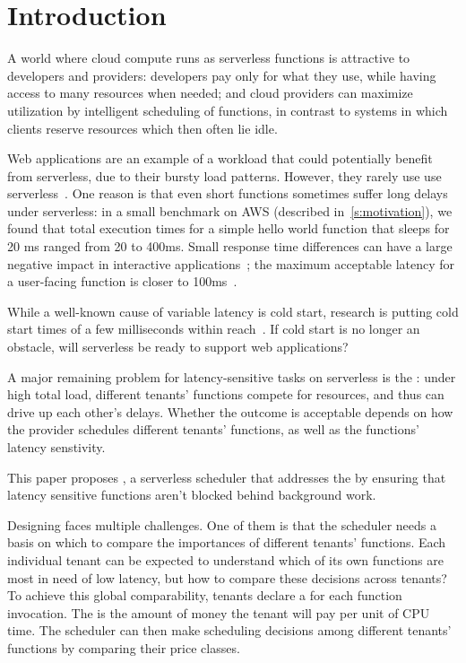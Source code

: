 \section{Introduction}
\label{s:intro}

A world where cloud compute runs as serverless functions is attractive to
developers and providers: developers pay only for what they use, while having
access to many resources when needed; and cloud providers can maximize
utilization by intelligent scheduling of functions, in contrast to systems in
which clients reserve resources which then often lie idle.

Web applications are an example of a workload that could potentially benefit
from serverless, due to their bursty load patterns. However, they rarely use use
serverless~\cite{reddit-serverless1, reddit-serverless2, not-lambda-blog}. One
reason is that even short functions sometimes suffer long delays under
serverless: in a small benchmark on AWS (described in~\autoref{s:motivation}), we found that total execution times for a
simple hello world function that sleeps for 20 ms ranged from 20 to 400ms. Small
response time differences can have a large negative impact in interactive
applications~\cite{amz-page-load,google-page-load}; the maximum acceptable
latency for a user-facing function is closer to 100ms~\cite{page-load-time}.

While a well-known cause of variable latency is cold start, research is putting
cold start times of a few milliseconds within reach~\cite{sigmaos,mitosis}. If
cold start is no longer an obstacle, will serverless be ready to support web
applications?

A major remaining problem for latency-sensitive tasks on serverless is the
\emph{\problem{}}: under high total load, different tenants' functions compete
for resources, and thus can drive up each other's delays. Whether the outcome is
acceptable depends on how the provider schedules different tenants' functions,
as well as the functions' latency senstivity.

This paper proposes \sys{}, a serverless scheduler that addresses the \problem{}
by ensuring that latency sensitive functions aren't blocked behind background
work.

Designing \sys{} faces multiple challenges. One of them is that the scheduler
needs a basis on which to compare the importances of different tenants'
functions. Each individual tenant can be expected to understand which of its own
functions are most in need of low latency, but how to compare these decisions
across tenants? To achieve this global comparability, tenants declare a
\emph{\priceclass{}} for each function invocation. The \priceclass{} is the
amount of money the tenant will pay per unit of CPU time. The scheduler can then
make scheduling decisions among different tenants' functions by comparing their
price classes.

